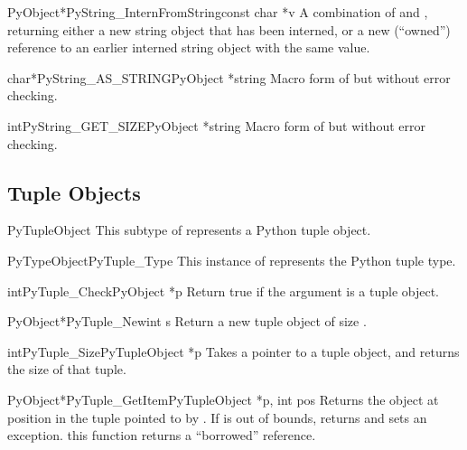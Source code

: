 \documentclass{manual}
\begin{document}
\begin{cfuncdesc}{PyObject*}{PyString_InternFromString}{const char *v}
A combination of  and
, returning either a new string object
that has been interned, or a new (``owned'') reference to an earlier
interned string object with the same value.
\end{cfuncdesc}

\begin{cfuncdesc}{char*}{PyString_AS_STRING}{PyObject *string}
Macro form of  but without error checking.
\end{cfuncdesc}

\begin{cfuncdesc}{int}{PyString_GET_SIZE}{PyObject *string}
Macro form of  but without error checking.
\end{cfuncdesc}



\subsection{Tuple Objects \label{tupleObjects}}

\begin{ctypedesc}{PyTupleObject}
This subtype of  represents a Python tuple object.
\end{ctypedesc}

\begin{cvardesc}{PyTypeObject}{PyTuple_Type}
This instance of  represents the Python tuple type.
\end{cvardesc}

\begin{cfuncdesc}{int}{PyTuple_Check}{PyObject *p}
Return true if the argument is a tuple object.
\end{cfuncdesc}

\begin{cfuncdesc}{PyObject*}{PyTuple_New}{int s}
Return a new tuple object of size .
\end{cfuncdesc}

\begin{cfuncdesc}{int}{PyTuple_Size}{PyTupleObject *p}
Takes a pointer to a tuple object, and returns the size
of that tuple.
\end{cfuncdesc}

\begin{cfuncdesc}{PyObject*}{PyTuple_GetItem}{PyTupleObject *p, int pos}
Returns the object at position  in the tuple pointed
to by .  If  is out of bounds, returns \NULL{} and
sets an  exception.   this
function returns a ``borrowed'' reference.
\end{cfuncdesc}
\end{document}
